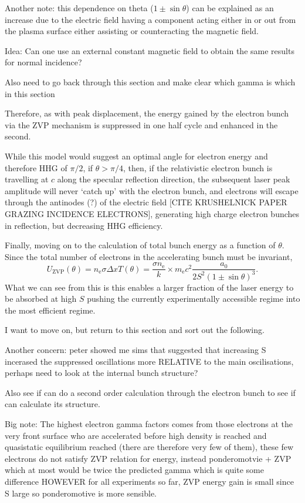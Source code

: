 Another note: this dependence on theta ($1\pm \sin\theta$) can be explained as an increase due to the electric field having a component acting either in or out from the plasma surface either assisting or counteracting the magnetic field.

Idea: Can one use an external constant magnetic field to obtain the same results for normal incidence?

Also need to go back through this section and make clear which gamma is which in this section

Therefore, as with peak displacement, the energy gained by the electron bunch via the ZVP mechanism is suppressed in one half cycle and enhanced in the second.

While this model would suggest an optimal angle for electron energy and therefore \ac{HHG} of $\pi/2$, if $\theta > \pi/4$, then, if the relativistic electron bunch is travelling at $c$ along the specular reflection direction, the subsequent laser peak amplitude will never `catch up' with the electron bunch, and electrons will escape through the antinodes (?) of the electric field [CITE KRUSHELNICK PAPER GRAZING INCIDENCE ELECTRONS], generating high charge electron bunches in reflection, but decreasing \ac{HHG efficiency}.

Finally, moving on to the calculation of total bunch energy as a function of $\theta$. Since the total number of electrons in the accelerating bunch must be invariant,
\begin{equation}\label{eq:zvp_Uzvp_theta}
	U_\mathrm{ZVP}(\theta) = n_\mathrm{e}\sigma\Delta x T(\theta) =  \frac{\sigma n_\mathrm{e}}{k}\times m_\mathrm{e}c^2\frac{a_0}{2S^2(1\pm \sin\theta)^3}.
\end{equation}
What we can see from this is this enables a larger fraction of the laser energy to be absorbed at high $S$ pushing the currently experimentally accessible regime into the most efficient regime.

I want to move on, but return to this section and sort out the following. 


Another concern: peter showed me sims that suggested that increasing S incerased the suppressed oscillations more RELATIVE to the main oscilisations, perhaps need to look at the internal bunch structure?

Also see if can do a second order calculation through the electron bunch to see if can calculate its structure.



Big note:
The highest electron gamma factors comes from those electrons at the very front surface who are accelerated before high density is reached and quasistatic equilibrium reached (there are therefore very few of them), these few electrons do not satisfy ZVP relation for energy, instead 
ponderomotvie + ZVP which at most would be twice the predicted gamma which is quite some difference HOWEVER for all experiments so far, ZVP energy gain is small since S large so ponderomotive is more sensible.



